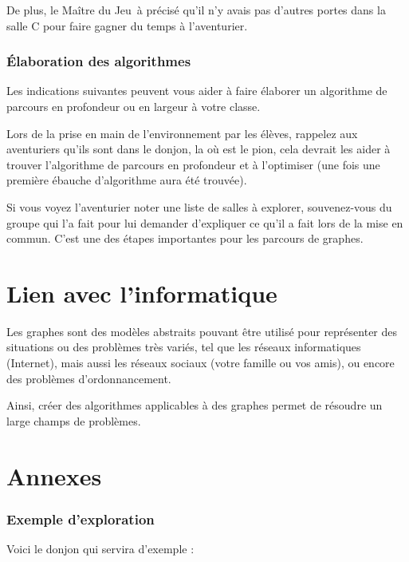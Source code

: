 \documentclass{article}
\newcommand{\mj}{Maître du Jeu}
\begin{document}
        \bigskip
        De plus, le \mj\ à précisé qu'il n'y avais pas d'autres portes dans la salle C pour faire gagner du temps à l'aventurier.

    \section{Élaboration des algorithmes}
        Les indications suivantes peuvent vous aider à faire élaborer un algorithme de parcours en profondeur ou en largeur à votre classe.

        Lors de la prise en main de l'environnement par les élèves, rappelez aux aventuriers qu'ils sont dans le donjon, la où est le pion, cela devrait les aider à trouver l'algorithme de parcours en profondeur et à l'optimiser (une fois une première ébauche d'algorithme aura été trouvée).

        Si vous voyez l'aventurier noter une liste de salles à explorer, souvenez-vous du groupe qui l'a fait pour lui demander d'expliquer ce qu'il a fait lors de la mise en commun. C'est une des étapes importantes pour les parcours de graphes.

\part{Lien avec l'informatique}
    Les graphes sont des modèles abstraits pouvant être utilisé pour représenter des situations ou des problèmes très variés, tel que les réseaux informatiques (Internet), mais aussi les réseaux sociaux (votre famille ou vos amis), ou encore des problèmes d'ordonnancement.

    Ainsi, créer des algorithmes applicables à des graphes permet de résoudre un large champs de problèmes.

\newpage
\appendix %

\part{Annexes}

    \section{Exemple d'exploration}
        \label{sec:Exemple}
        Voici le donjon qui servira d'exemple : \\

        \bigskip
\end{document}
